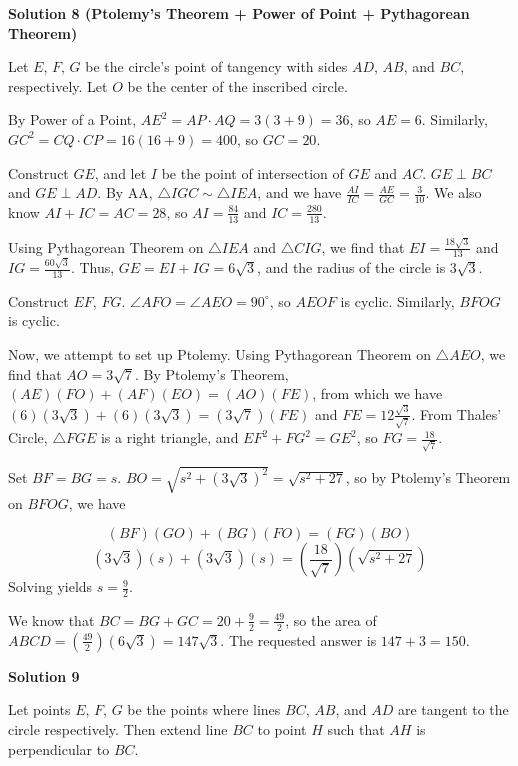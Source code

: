 \begin{enumerate}
\textbf{Solution 8 (Ptolemy's Theorem + Power of Point + Pythagorean Theorem)}

Let $E$, $F$, $G$ be the circle's point of tangency with sides $AD$, $AB$, and $BC$, respectively. Let $O$ be the center of the inscribed circle.

 By Power of a Point, $AE^2 = AP \cdot AQ = 3(3+9) = 36$, so $AE = 6$. Similarly, $GC^2 = CQ \cdot CP = 16(16+9) = 400$, so $GC = 20$.

 Construct $GE$, and let $I$ be the point of intersection of $GE$ and $AC$. $GE \perp BC$ and $GE \perp AD$. By AA, $\triangle IGC \sim \triangle IEA$, and we have $\frac{AI}{IC} = \frac{AE}{GC} = \frac{3}{10}$. We also know $AI + IC = AC = 28$, so $AI = \frac{84}{13}$ and $IC = \frac{280}{13}$.

 Using Pythagorean Theorem on $\triangle IEA$ and $\triangle CIG$, we find that $EI = \frac{18\sqrt{3}}{13}$ and $IG = \frac{60\sqrt{3}}{13}$. Thus, $GE = EI + IG = 6\sqrt{3}$, and the radius of the circle is $3\sqrt{3}$.

 Construct $EF$, $FG$. $\angle AFO = \angle AEO = 90^{\circ}$, so $AEOF$ is cyclic. Similarly, $BFOG$ is cyclic.

 Now, we attempt to set up Ptolemy. Using Pythagorean Theorem on $\triangle AEO$, we find that $AO = 3\sqrt{7}$. By Ptolemy's Theorem, $(AE)(FO) + (AF)(EO) = (AO)(FE)$, from which we have $(6)(3\sqrt{3}) + (6)(3\sqrt{3}) = (3\sqrt{7})(FE)$ and $FE = 12\frac{\sqrt{3}}{\sqrt{7}}$. From Thales' Circle, $\triangle FGE$ is a right triangle, and $EF^2 + FG^2 = GE^2$, so $FG = \frac{18}{\sqrt{7}}$.

 Set $BF = BG = s$. $BO = \sqrt{s^2 + (3\sqrt{3})^2} = \sqrt{s^2+27}$, so by Ptolemy's Theorem on $BFOG$, we have

 
 \[(BF)(GO) + (BG)(FO) = (FG)(BO)\]
 \[(3\sqrt{3})(s) + (3\sqrt{3})(s) = (\frac{18}{\sqrt{7}})(\sqrt{s^2+27})\]Solving yields $s = \frac{9}{2}$.

 We know that $BC = BG + GC = 20 + \frac{9}{2} = \frac{49}{2}$, so the area of $ABCD = (\frac{49}{2})(6\sqrt{3}) = 147\sqrt{3}$. The requested answer is $147 + 3 = \boxed{150}$.

 



\textbf{Solution 9}

Let points $E$, $F$, $G$ be the points where lines $BC$, $AB$, and $AD$ are tangent to the circle respectively. Then extend line $BC$ to point $H$ such that $AH$ is perpendicular to $BC$.


\end{enumerate}
